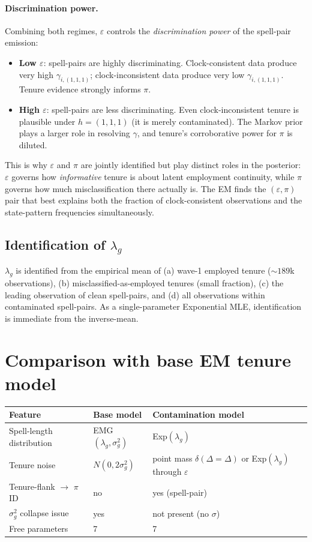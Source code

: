 \documentclass[12pt]{article}
\begin{document}
\paragraph{Discrimination power.}
Combining both regimes, \(\varepsilon\) controls the \emph{discrimination
power} of the spell-pair emission:
\begin{itemize}
\item \textbf{Low \(\varepsilon\)}: spell-pairs are highly
  discriminating. Clock-consistent data produce very high
  \(\gamma_{i,(1,1,1)}\); clock-inconsistent data produce very low
  \(\gamma_{i,(1,1,1)}\). Tenure evidence strongly informs \(\pi\).
\item \textbf{High \(\varepsilon\)}: spell-pairs are less
  discriminating. Even clock-inconsistent tenure is plausible under
  \(h = (1,1,1)\) (it is merely contaminated). The Markov prior
  plays a larger role in resolving \(\gamma\), and tenure's
  corroborative power for \(\pi\) is diluted.
\end{itemize}
This is why \(\varepsilon\) and \(\pi\) are jointly identified but play
distinct roles in the posterior: \(\varepsilon\) governs how
\emph{informative} tenure is about latent employment continuity, while
\(\pi\) governs how much misclassification there actually is. The EM
finds the \((\varepsilon, \pi)\) pair that best explains both the
fraction of clock-consistent observations and the state-pattern
frequencies simultaneously.

\subsection{Identification of \(\lambda_g\)}

\(\lambda_g\) is identified from the empirical mean of (a) wave-1 employed
tenure (\(\sim 189\)k observations), (b) misclassified-as-employed tenures
(small fraction), (c) the leading observation of clean spell-pairs, and
(d) all observations within contaminated spell-pairs. As a single-parameter
Exponential MLE, identification is immediate from the inverse-mean.

\section{Comparison with base EM tenure model}
\label{sec:design_choices}

\begin{center}
\begin{tabular}{llll}
\toprule
Feature & Base model & Contamination model \\
\midrule
Spell-length distribution & EMG\((\lambda_g,\sigma_g^2)\) & Exp\((\lambda_g)\) \\
Tenure noise & \(N(0,2\sigma_g^2)\) & point mass \(\delta(\Delta=\Delta)\) or Exp\((\lambda_g)\) through \(\varepsilon\) \\
Tenure-flank \(\to\) \(\pi\) ID & no & yes (spell-pair) \\
\(\sigma_g^2\) collapse issue & yes &  not present (no \(\sigma\)) \\
Free parameters & 7 & 7 \\
\bottomrule
\end{tabular}
\end{center}
\end{document}
